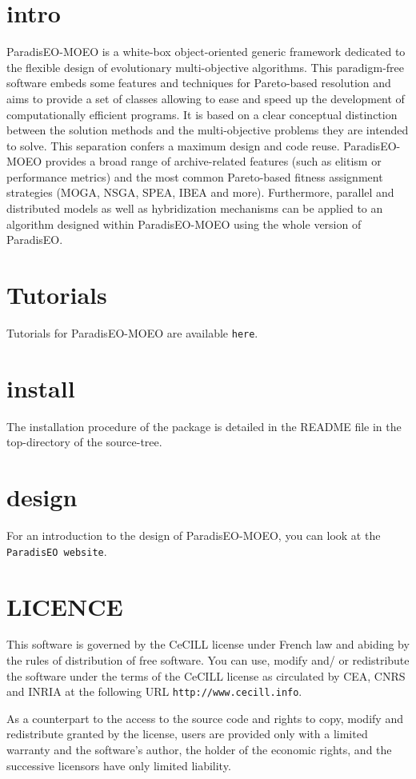 \section{intro}\label{main_intro}
Paradis\-EO-MOEO is a white-box object-oriented generic framework dedicated to the flexible design of evolutionary multi-objective algorithms. This paradigm-free software embeds some features and techniques for Pareto-based resolution and aims to provide a set of classes allowing to ease and speed up the development of computationally efficient programs. It is based on a clear conceptual distinction between the solution methods and the multi-objective problems they are intended to solve. This separation confers a maximum design and code reuse. Paradis\-EO-MOEO provides a broad range of archive-related features (such as elitism or performance metrics) and the most common Pareto-based fitness assignment strategies (MOGA, NSGA, SPEA, IBEA and more). Furthermore, parallel and distributed models as well as hybridization mechanisms can be applied to an algorithm designed within Paradis\-EO-MOEO using the whole version of Paradis\-EO.\section{Tutorials}\label{main_tutorials}
Tutorials for Paradis\-EO-MOEO are available {\tt here}.\section{install}\label{main_install}
The installation procedure of the package is detailed in the README file in the top-directory of the source-tree.\section{design}\label{main_design}
For an introduction to the design of Paradis\-EO-MOEO, you can look at the {\tt Paradis\-EO website}.\section{LICENCE}\label{main_LICENCE}
This software is governed by the Ce\-CILL license under French law and abiding by the rules of distribution of free software. You can use, modify and/ or redistribute the software under the terms of the Ce\-CILL license as circulated by CEA, CNRS and INRIA at the following URL {\tt http://www.cecill.info}.

As a counterpart to the access to the source code and rights to copy, modify and redistribute granted by the license, users are provided only with a limited warranty and the software's author, the holder of the economic rights, and the successive licensors have only limited liability.

